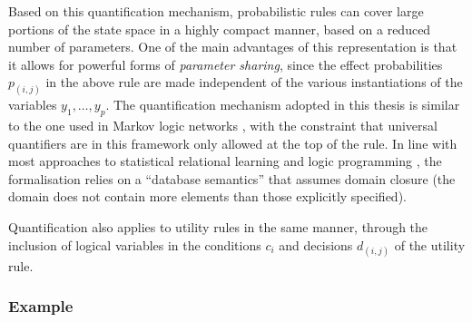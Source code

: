 Based on this quantification mechanism, probabilistic rules can cover large portions of the state space in a highly compact manner, based on a reduced number of parameters. One of the main advantages of this representation is that it allows for powerful forms of \textit{parameter sharing}, since the effect probabilities $p_{(i,j)}$ in the above rule are made independent of the various instantiations of the variables $y_1, \dots, y_p$.  The quantification mechanism adopted in this thesis is similar to the one used in Markov logic networks \citep{Richardson:2006}, with the constraint that universal quantifiers are in this framework only allowed at the top of the rule.  In line with most approaches to statistical relational learning \citep{getoor:srlbook07} and logic programming \citep{Poole:2008}, the formalisation relies on a ``database semantics'' that assumes domain closure (the domain does not contain more elements than those explicitly specified). 

Quantification also applies to utility rules in the same manner, through the inclusion of logical variables in the conditions $c_i$ and decisions $d_{(i,j)}$  of the utility rule. 

\subsubsection*{Example}

